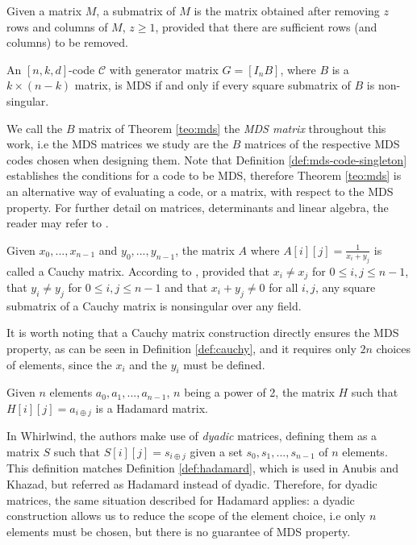 \begin{definition}[Submatrix]
Given a matrix $M$, a submatrix of $M$ is the matrix obtained after removing $z$ rows and columns of $M$, $z \geq 1$, provided that there are sufficient rows (and columns) to be removed.
\end{definition}

\begin{theorem}\label{teo:mds}
An $[n, k, d]$-code $\mathcal{C}$ with generator matrix $G = [I_nB]$, where $B$ is a $k \times (n - k)$ matrix, is MDS if and only if every square submatrix of $B$ is non-singular.
\end{theorem}

We call the $B$ matrix of Theorem \ref{teo:mds} the \emph{MDS matrix} throughout this work, i.e the MDS matrices we study are the $B$ matrices of the respective MDS codes chosen when designing them.
Note that Definition \ref{def:mds-code-singleton} establishes the conditions for a code to be MDS, therefore Theorem \ref{teo:mds} is an alternative way of evaluating a code, or a matrix, with respect to the MDS property.
For further detail on matrices, determinants and linear algebra, the reader may refer to \cite{LangeLinearAlgebra}.

\begin{definition}\label{def:cauchy}
Given $x_0, ..., x_{n-1}$ and $y_0, ..., y_{n-1}$, the matrix $A$ where $A[i][j] = \frac{1}{x_i + y_j}$ is called a Cauchy matrix. According to \cite{Youssef1997}, provided that $x_i \neq x_j$ for $0\leq i,j\leq n-1$, that $y_i \neq y_j$ for $0\leq i,j\leq n-1$ and that $x_i + y_j \neq 0$ for all $i, j$, any square submatrix of a Cauchy matrix is nonsingular over any field.
\end{definition}

It is worth noting that a Cauchy matrix construction directly ensures the MDS property, as can be seen in Definition \ref{def:cauchy}, and it requires only $2n$ choices of elements, since the $x_i$ and the $y_i$ must be defined.

\begin{definition}\label{def:hadamard}
Given $n$ elements $a_0, a_1, ..., a_{n-1}$, $n$ being a power of 2, the matrix $H$ such that $H[i][j] = a_{i \oplus j}$ is a Hadamard matrix.
\end{definition}

In Whirlwind\cite{Whirlwind2010}, the authors make use of \emph{dyadic} matrices, defining them as a matrix $S$ such that $S[i][j] = s_{i\oplus j}$ given a set $s_0, s_1, ... , s_{n-1}$ of $n$ elements. This definition matches Definition \ref{def:hadamard}, which is used in Anubis and Khazad, but referred as Hadamard instead of dyadic. Therefore, for dyadic matrices, the same situation described for Hadamard applies: a dyadic construction allows us to reduce the scope of the element choice, i.e only $n$ elements must be chosen, but there is no guarantee of MDS property.

